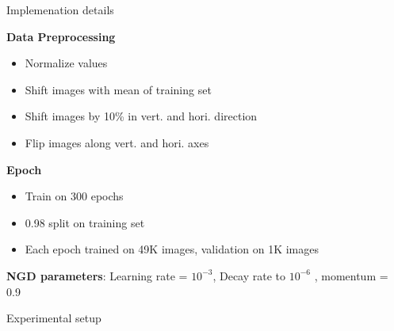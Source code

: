 \documentclass[20pt]{beamer}
\newlength{\onecolwid}
\begin{document}
\begin{frame}[t]
\begin{columns}[t]
\begin{column}{\onecolwid}
\begin{block}{Implemenation details}
	\begin{minipage}{0.5\onecolwid}
	\textbf{Data Preprocessing}
	\begin{itemize}
	\item Normalize values 
	\item Shift images with mean of training set
	\item Shift images by 10\% in vert. and hori. direction
	\item Flip images along vert. and hori. axes
	\end{itemize}
	\end{minipage}
	\hfill
	\begin{minipage}{0.5\onecolwid}
	\textbf{Epoch}
			\begin{itemize}
			\item Train on 300 epochs
			\item 0.98 split on training set 
			\item Each epoch trained on 49K images, validation on 1K images
			\end{itemize}
	\textbf{NGD parameters}: Learning rate = $10^{-3}$, Decay rate to $10^{-6}$ , momentum = 0.9

	\end{minipage}
\end{block}

\begin{block}{Experimental setup}


\end{block}
\end{column}
\end{columns}
\end{frame}
\end{document}
